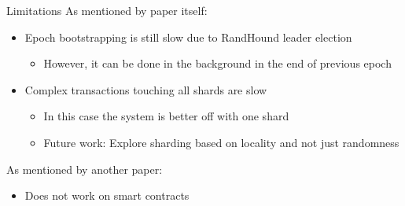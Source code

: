 	\begin{frame}{Limitations}
		As mentioned by paper itself:
		\begin{itemize}
			\item Epoch bootstrapping is still slow due to RandHound leader election
			\begin{itemize}
				\item However, it can be done in the background in the end of previous epoch
			\end{itemize}
			\item Complex transactions touching all shards are slow
			\begin{itemize}
				\item In this case the system is better off with one shard
				\item Future work: Explore sharding based on locality and not just randomness
			\end{itemize}
		\end{itemize}
		
		As mentioned by another paper:
    \begin{itemize}
			\item Does not work on smart contracts
		\end{itemize}
  \end{frame}
	

	
